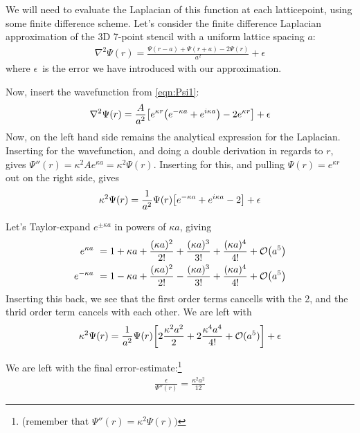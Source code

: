 \documentclass[12p,a4paper]{article}
\renewcommand{\exp}{e^}
\renewcommand{\exp}{e^}
\begin{document}
We will need to evaluate the Laplacian of this function at each latticepoint, using some finite difference scheme. Let's consider the finite difference Laplacian approximation of the 3D 7-point stencil with a uniform lattice spacing $a$:
\begin{align}
    \nabla^2 \Psi(r) = \frac{\Psi(r-a) + \Psi(r+a) - 2\Psi(r)}{a^2} + \epsilon
\end{align}
where $\epsilon$ is the error we have introduced with our approximation.

Now, insert the wavefunction from \ref{eqn:Psi1}:
\begin{align}
    \nabla^2 \Psi(r) = \frac{A}{a^2}\qty[\exp{\kappa r}\qty(\exp{-\kappa a} + \exp{i\kappa a}) - 2\exp{\kappa r}] + \epsilon
\end{align}
Now, on the left hand side remains the analytical expression for the Laplacian. Inserting for the wavefunction, and doing a double derivation in regards to $r$, gives $\Psi''(r) = \kappa^2A\exp{\kappa a} = \kappa^2\Psi(r)$. Inserting for this, and pulling $\Psi(r) = \exp{\kappa r}$ out on the right side, gives
\begin{align}
    \kappa^2 \Psi(r) = \frac{1}{a^2}\Psi(r)\qty[\exp{-\kappa a} + \exp{i\kappa a} - 2] + \epsilon
\end{align}

Let's Taylor-expand $\exp{\pm\kappa a}$ in powers of $\kappa a$, giving
\begin{align*}
    \exp{\kappa a} = 1 + \kappa a + \frac{(\kappa a)^2}{2!} + \frac{(\kappa a)^3}{3!} + \frac{(\kappa a)^4}{4!} + \mathcal{O}{\qty(a^5)} \\
    \exp{-\kappa a} = 1 - \kappa a + \frac{(\kappa a)^2}{2!} - \frac{(\kappa a)^3}{3!} + \frac{(\kappa a)^4}{4!} + \mathcal{O}{\qty(a^5)}
\end{align*}
Inserting this back, we see that the first order terms cancells with the 2, and the thrid order term cancels with each other. We are left with
\begin{align}
    \kappa^2 \Psi(r) = \frac{1}{a^2}\Psi(r)\qty[2\frac{\kappa^2a^2}{2} + 2\frac{\kappa^4a^4}{4!} + \mathcal{O}(a^5)] + \epsilon
\end{align}

We are left with the final error-estimate:\footnote{(remember that $\Psi''(r) = \kappa^2\Psi(r))$}
\begin{align}
    \frac{\epsilon}{\Psi''(r)} = \frac{\kappa^2a^2}{12}
\end{align}
\end{document}
